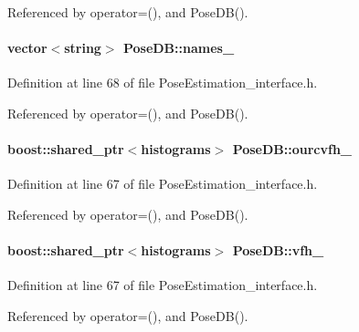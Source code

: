 Referenced by operator=(), and Pose\-D\-B().

\hypertarget{classPoseDB_a2870a93aa6304528109ce29204c95f51}{
\paragraph[{names\-\_\-}]{\setlength{\rightskip}{0pt plus 5cm}vector$<$string$>$ Pose\-D\-B\-::names\-\_\-\hspace{0.3cm}{\ttfamily [private]}}}\label{classPoseDB_a2870a93aa6304528109ce29204c95f51}


Definition at line 68 of file Pose\-Estimation\-\_\-interface.\-h.



Referenced by operator=(), and Pose\-D\-B().

\hypertarget{classPoseDB_a1a7c85d9cb1c33e27abe73f7d61aef6d}{
\paragraph[{ourcvfh\-\_\-}]{\setlength{\rightskip}{0pt plus 5cm}boost\-::shared\-\_\-ptr$<${\bf histograms}$>$ Pose\-D\-B\-::ourcvfh\-\_\-\hspace{0.3cm}{\ttfamily [private]}}}\label{classPoseDB_a1a7c85d9cb1c33e27abe73f7d61aef6d}


Definition at line 67 of file Pose\-Estimation\-\_\-interface.\-h.



Referenced by operator=(), and Pose\-D\-B().

\hypertarget{classPoseDB_ab0d34fd8b0fc5f74e2b7fc5261fdab8e}{
\paragraph[{vfh\-\_\-}]{\setlength{\rightskip}{0pt plus 5cm}boost\-::shared\-\_\-ptr$<${\bf histograms}$>$ Pose\-D\-B\-::vfh\-\_\-\hspace{0.3cm}{\ttfamily [private]}}}\label{classPoseDB_ab0d34fd8b0fc5f74e2b7fc5261fdab8e}


Definition at line 67 of file Pose\-Estimation\-\_\-interface.\-h.



Referenced by operator=(), and Pose\-D\-B().


